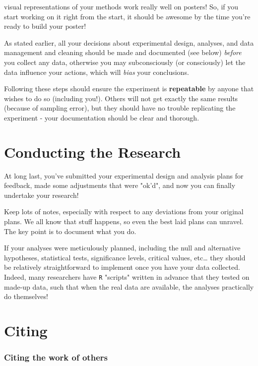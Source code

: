 \documentclass[
]{book}
\begin{document}
visual representations of your methods work really well on posters! So, if you start working on it right from the start, it should be awesome by the time you're ready to build your poster!

As stated earlier, all your decisions about experimental design, analyses, and data management and cleaning should be made and documented (see below) \emph{before} you collect any data, otherwise you may subconsciously (or consciously) let the data influence your actions, which will \emph{bias} your conclusions.

Following these steps should ensure the experiment is \textbf{repeatable} by anyone that wishes to do so (including you!). Others will not get exactly the same results (because of sampling error), but they should have no trouble replicating the experiment - your documentation should be clear and thorough.

\hypertarget{conducting-the-research}{%
\chapter*{Conducting the Research}\label{conducting-the-research}}

At long last, you've submitted your experimental design and analysis plans for feedback, made some adjustments that were "ok'd", and now you can finally undertake your research!

Keep lots of notes, especially with respect to any deviations from your original plans. We all know that stuff happens, so even the best laid plans can unravel. The key point is to document what you do.

If your analyses were meticulously planned, including the null and alternative hypotheses, statistical tests, significance levels, critical values, etc\ldots{} they should be relatively straightforward to implement once you have your data collected. Indeed, many researchers have \texttt{R} "scripts" written in advance that they tested on made-up data, such that when the real data are available, the analyses practically do themselves!

\hypertarget{citing}{%
\chapter*{Citing}\label{citing}}

\hypertarget{citing-the-work-of-others}{%
\subsection*{Citing the work of others}\label{citing-the-work-of-others}}
\end{document}
